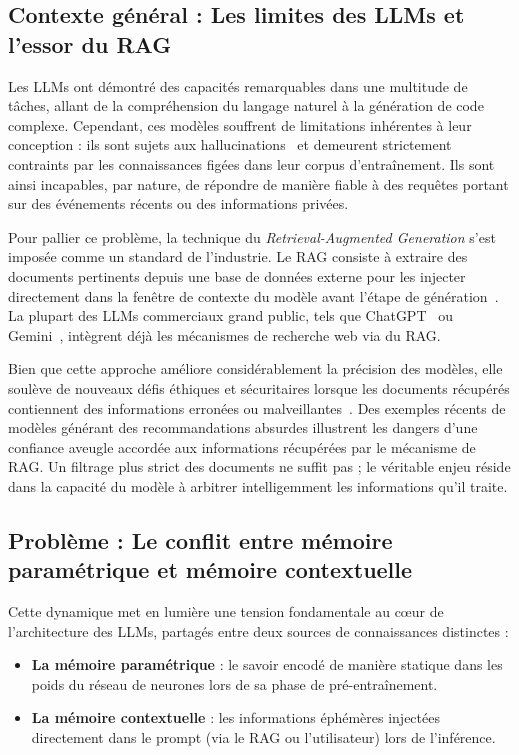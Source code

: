 \documentclass[11pt, a4paper]{article}
\begin{document}
\subsection{Contexte général : Les limites des LLMs et l'essor du RAG}

Les LLMs ont démontré des capacités remarquables dans une multitude de tâches, allant de la compréhension du langage naturel à la génération de code complexe. Cependant, ces modèles souffrent de limitations inhérentes à leur conception : ils sont sujets aux hallucinations~\cite{pal2023, sun2024, ahmad2023} et demeurent strictement contraints par les connaissances figées dans leur corpus d'entraînement. Ils sont ainsi incapables, par nature, de répondre de manière fiable à des requêtes portant sur des événements récents ou des informations privées. 

Pour pallier ce problème, la technique du \textit{Retrieval-Augmented Generation} s'est imposée comme un standard de l'industrie. Le RAG consiste à extraire des documents pertinents depuis une base de données externe pour les injecter directement dans la fenêtre de contexte du modèle avant l'étape de génération~\cite{lewis2020rag, chen2024}. La plupart des LLMs commerciaux grand public, tels que ChatGPT~\cite{openai2023} ou Gemini~\cite{geminiteam2023}, intègrent déjà les mécanismes de recherche web via du RAG. 

Bien que cette approche améliore considérablement la précision des modèles, elle soulève de nouveaux défis éthiques et sécuritaires lorsque les documents récupérés contiennent des informations erronées ou malveillantes~\cite{daws2020}. Des exemples récents de modèles générant des recommandations absurdes illustrent les dangers d'une confiance aveugle accordée aux informations récupérées par le mécanisme de RAG. Un filtrage plus strict des documents ne suffit pas ; le véritable enjeu réside dans la capacité du modèle à arbitrer intelligemment les informations qu'il traite.



\subsection{Problème : Le conflit entre mémoire paramétrique et mémoire contextuelle}

Cette dynamique met en lumière une tension fondamentale au cœur de l'architecture des LLMs, partagés entre deux sources de connaissances distinctes :
\begin{itemize}
    \item \textbf{La mémoire paramétrique} : le savoir encodé de manière statique dans les poids du réseau de neurones lors de sa phase de pré-entraînement.
    \item \textbf{La mémoire contextuelle} : les informations éphémères injectées directement dans le prompt (via le RAG ou l'utilisateur) lors de l'inférence.
\end{itemize}
\end{document}
